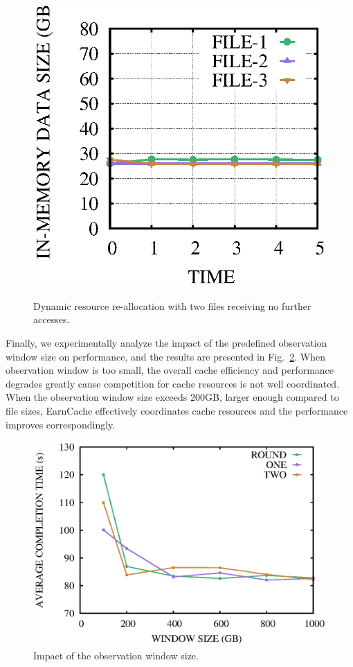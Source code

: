 \begin{figure}[!htbp]
{\begin{minipage}[b]{0.47\linewidth}
        \includegraphics[scale=0.41]{figures/3-2-maxmin-1000-ds.eps}
        \label{fig:3-2-b}
        \end{minipage}
    }
    \caption{Dynamic resource re-allocation with two files receiving no further accesses.}
    \label{fig:3-2}
\end{figure}

Finally, we experimentally analyze the impact of the predefined observation window size on performance, and the results are presented in Fig.~\ref{fig:time_windowsize}.
When observation window is too small, the overall cache efficiency and performance degrades greatly cause competition for cache resources is not well coordinated.
When the observation window size exceeds 200GB, larger enough compared to file sizes, EarnCache effectively coordinates cache resources and the performance improves correspondingly.

\begin{figure}[!htbp]
\centering
\includegraphics[scale=0.41]{figures/window_size_time.eps}
\caption{Impact of the observation window size.}
\label{fig:time_windowsize}
\end{figure} 